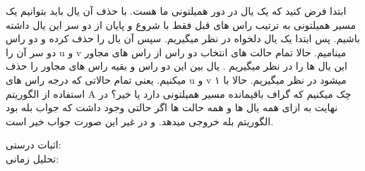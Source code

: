 \problem{}
ابتدا فرض کنید که یک یال در دور همیلتونی ما هست.
با حذف آن یال باید بتوانیم یک مسیر همیلتونی به ترتیب راس های قبل فقط با شروع و پایان از
دو سر این یال داشته باشیم.
پس ابتدا یک یال دلخواه در نظر میگیریم.
سپس آن یال را حذف کرده و دو راس دو سر آن را u و v مینامیم.
حالا تمام حالت های انتخاب دو راس از راس های مجاور این یال ها را در نظر میگیریم . 
یال بین این دو راس و بقیه راس های مجاور را حذف میکنیم.
یعنی تمام حالاتی که درجه راس های u و v ۱ میشود در نظر میگیریم.
حالا با استفاده از الگوریتم A چک میکنیم که گراف باقیمانده مسیر همیلتونی دارد یا خیر؟
در نهایت به ازای همه یال ها و همه حالت ها اگر حالتی وجود داشت که جواب بله بود الگوریتم
بله خروجی میدهد. و در غیر این صورت جواب خیر است.

اثبات درستی:\\
تحلیل زمانی:\\
